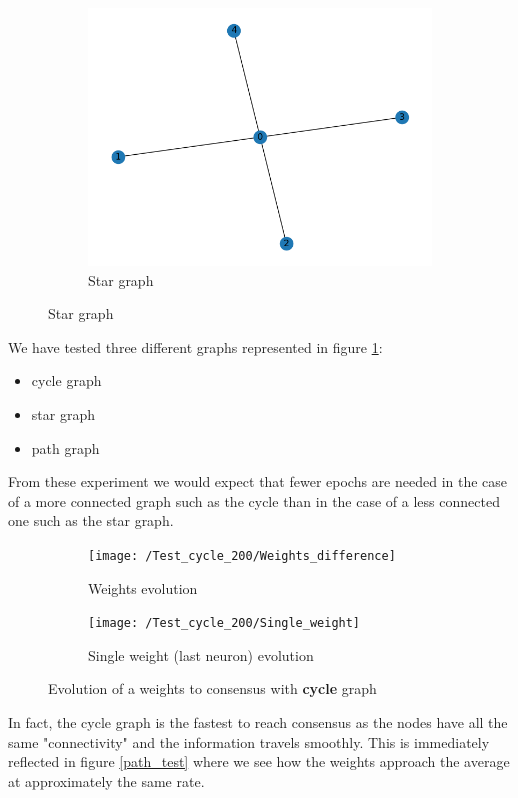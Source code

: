 \documentclass[a4paper,11pt,oneside]{book}
\begin{document}
\begin{figure}[H]
\begin{subfigure}{0.32\textwidth}
    \includegraphics[width=\textwidth]{figs/Test_star_200/Graph.png}
    \caption{Star graph}
    \end{subfigure}
\label{Graphs}
\end{figure}

\bigskip
We have tested three different graphs represented in figure \ref{Graphs}:
\begin{itemize}
\item cycle graph
\item star graph
\item path graph
\end{itemize}



From these experiment we would expect that fewer epochs are needed in the case of a more connected graph such as the cycle than in the case of a less connected one such as the star graph.

\begin{figure}[H]
\centering
	\begin{subfigure}{0.49\textwidth}	
	\texttt{[image: /Test\_cycle\_200/Weights\_difference]}
	\caption{Weights evolution}
	\end{subfigure}
\hfill
	\begin{subfigure}{0.49\textwidth}	
	\texttt{[image: /Test\_cycle\_200/Single\_weight]}
	\caption{Single weight (last neuron) evolution}
	\end{subfigure}
\caption{Evolution of a weights to consensus with \textbf{cycle} graph}
\label{cycle_test}
\end{figure}

In fact, the cycle graph is the fastest to reach consensus as the nodes have all the same "connectivity" and the information travels smoothly. This is immediately reflected in figure \ref{path_test} where we see how the weights approach the average at approximately the same rate.
\end{document}
